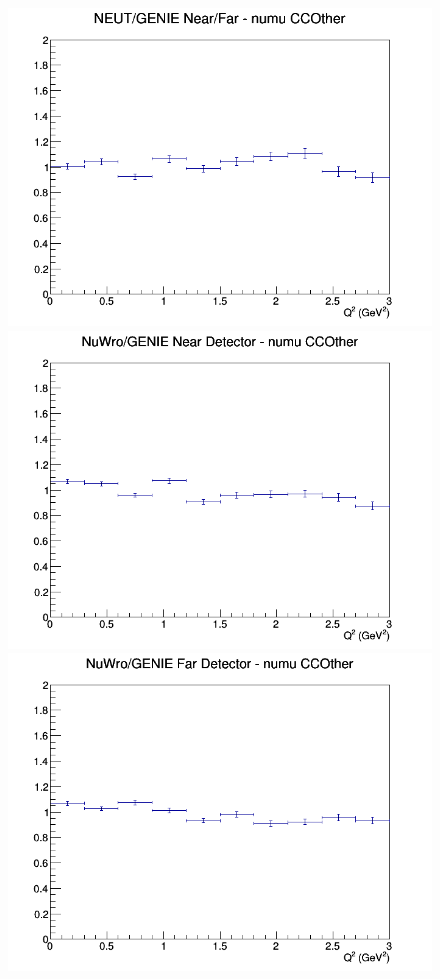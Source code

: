 \documentclass[12pt]{article}
\begin{document}
\begin{figure}[h]
\endminipage
{}
\includegraphics[width=\linewidth]{eff_Q2/LAr/ratios/CCOther_NEUT_GENIE_numu_NF_Q2.png}
\endminipage
\newline
{}
\includegraphics[width=\linewidth]{eff_Q2/LAr/ratios/CCOther_NuWro_GENIE_numu_near_Q2.png}
\endminipage
{}
\includegraphics[width=\linewidth]{eff_Q2/LAr/ratios/CCOther_NuWro_GENIE_numu_far_Q2.png}

\end{figure}
\end{document}
